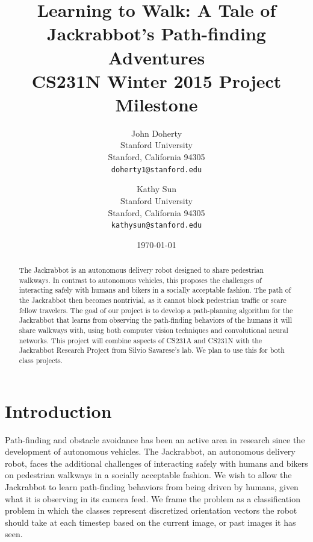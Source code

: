 \documentclass[10pt,twocolumn,letterpaper]{article}
\begin{document}
\title{Learning to Walk: A Tale of Jackrabbot’s Path-finding Adventures \\ CS231N Winter 2015 Project Milestone}

\author{John Doherty\\
Stanford University\\
Stanford, California 94305\\
{\tt\small doherty1@stanford.edu}
\and
Kathy Sun\\
Stanford University\\
Stanford, California 94305\\
{\tt\small kathysun@stanford.edu}
}

\date{\today}

\maketitle

\begin{abstract}
The Jackrabbot is an autonomous delivery robot designed to share pedestrian walkways. In contrast to autonomous vehicles, this proposes the challenges of interacting safely with humans and bikers in a socially acceptable fashion. The path of the Jackrabbot then becomes nontrivial, as it cannot block pedestrian traffic or scare fellow travelers. The goal of our project is to develop a path-planning algorithm for the Jackrabbot that learns from observing the path-finding behaviors of the humans it will share walkways with, using both computer vision techniques and convolutional neural networks. This project will combine aspects of CS231A and CS231N with the Jackrabbot Research Project from Silvio Savarese's lab. We plan to use this for both class projects.
\end{abstract}

\section{Introduction}

Path-finding and obstacle avoidance has been an active area in research since the development of autonomous vehicles.  The Jackrabbot, an autonomous delivery robot, faces the additional challenges of interacting safely with humans and bikers on pedestrian walkways in a socially acceptable fashion. We wish to allow the Jackrabbot to learn path-finding behaviors from being driven by humans, given what it is observing in its camera feed. We frame the problem as a classification problem in which the classes represent discretized orientation vectors the robot should take at each timestep based on the current image, or past images it has seen.
\end{document}
